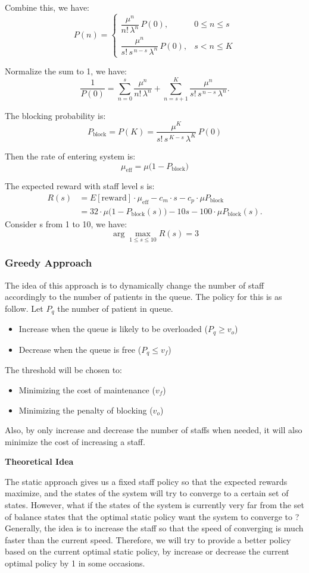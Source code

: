 \documentclass{article}
\begin{document}
Combine this, we have:
\[P(n)=\begin{cases}
\dfrac{\mu^n}{n!\,\lambda^n} \, P(0), & 0 \le n \le s \\[1em]
\dfrac{\mu^n}{s!\,s^{\,n-s}\,\lambda^n} \, P(0), & s < n \le K
\end{cases}
\]

Normalize the sum to 1, we have:
\[\dfrac{1}{P(0)}=\sum_{n=0}^{s}
\frac{\mu^n}{n!\,\lambda^n}
+\sum_{n=s+1}^{K}
\frac{\mu^n}{s!\,s^{\,n-s}\,\lambda^n}.
\]


The blocking probability is:
\[P_{\text{block}} = P(K)=\frac{\mu^K}{s!\,s^{\,K-s}\,\lambda^K} \, P(0)\]

Then the rate of entering system is:
\[\mu_{\text{eff}}=\mu \bigl(1 - P_{\text{block}}\bigr)\]

The expected reward with staff level s is:
\begin{align*}
    R(s)&=E[\text{reward}] \cdot \mu_{\text{eff}}-c_m \cdot s-c_p \cdot \mu P_{\text{block}}\\
    &= 32 \cdot \mu \bigl(1 - P_{\text{block}}(s)\bigr)-10s-100 \cdot \mu P_{\text{block}}(s).
\end{align*}
Consider s from 1 to 10, we have:
\[\arg\max_{1 \leq s \leq 10} R(s)= 3\]

\subsubsection*{Greedy Approach}
The idea of this approach is to dynamically change the number of staff accordingly to the number of patients in the queue. The policy for this is as follow. Let $P_q$ the number of patient in queue.
\begin{itemize}
    \item Increase when the queue is likely to be overloaded ($P_q \geq v_o$)
    \item Decrease when the queue is free ($P_q \leq v_f$)
\end{itemize}
The threshold will be chosen to:
\begin{itemize}
    \item Minimizing the cost of maintenance ($v_f$)
    \item Minimizing the penalty of blocking ($v_o$)
\end{itemize}
Also, by only increase and decrease the number of staffs when needed, it will also minimize the cost of increasing a staff.

\textbf{Theoretical Idea}

The static approach gives us a fixed staff policy so that the expected rewards
maximize, and the states of the system will try to converge to a certain set of states.
However, what if the states of the system is currently very far from the set of
balance states that the optimal static policy want the system to converge to ? Generally, the
idea is to increase the staff so that the speed of converging is much faster than the
current speed. Therefore, we will try to provide a better policy based on the current optimal
static policy, by increase or decrease the current optimal policy by 1 in some occasions. 
\end{document}
